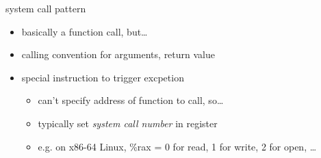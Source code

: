 \begin{frame}{system call pattern}
    \begin{itemize}
    \item basically a function call, but\ldots
    \vspace{.5cm}
    \item calling convention for arguments, return value
    \item special instruction to trigger excpetion
        \begin{itemize}
        \item can't specify address of function to call, so\ldots
        \item typically set \textit{system call number} in register
        \item e.g. on x86-64 Linux, \%rax = 0 for read, 1 for write, 2 for open, \ldots
        \end{itemize}
    \end{itemize}
\end{frame}
